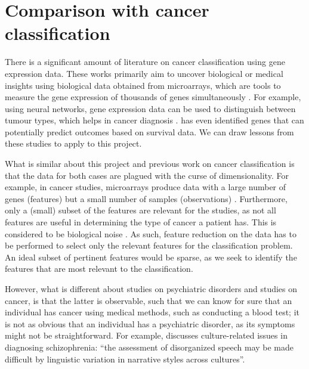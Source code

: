 \documentclass[12pt, twoside, a4paper]{report}
\begin{document}
\section{Comparison with cancer classification} \label{bg:cancer}

There is a significant amount of literature on cancer classification using gene expression data. These works primarily aim to uncover biological or medical insights using biological data obtained from microarrays, which are tools to measure the gene expression of thousands of genes simultaneously \citep{RefWorks:79}. For example, using neural networks, gene expression data can be used to distinguish between tumour types, which helps in cancer diagnosis \citep{RefWorks:80, RefWorks:88}. \cite{RefWorks:199} has even identified genes that can potentially predict outcomes based on survival data. We can draw lessons from these studies to apply to this project.

What is similar about this project and previous work on cancer classification is that the data for both cases are plagued with the curse of dimensionality. For example, in cancer studies, microarrays produce data with a large number of genes (features) but a small number of samples (observations) \cite{RefWorks:88}. Furthermore, only a (small) subset of the features are relevant for the studies, as not all features are useful in determining the type of cancer a patient has. This is considered to be biological noise \cite{RefWorks:89}. As such, feature reduction on the data has to be performed to select only the relevant features for the classification problem. An ideal subset of pertinent features would be sparse, as we seek to identify the features that are most relevant to the classification.

However, what is different about studies on psychiatric disorders and studies on cancer, is that the latter is observable, such that we can know for sure that an individual has cancer using medical methods, such as conducting a blood test; it is not as obvious that an individual has a psychiatric disorder, as its symptoms might not be straightforward. For example, \cite{RefWorks:114} discusses culture-related issues in diagnosing schizophrenia: ``the assessment of disorganized speech may be made difficult by linguistic variation in narrative styles across cultures''.

\end{document}
